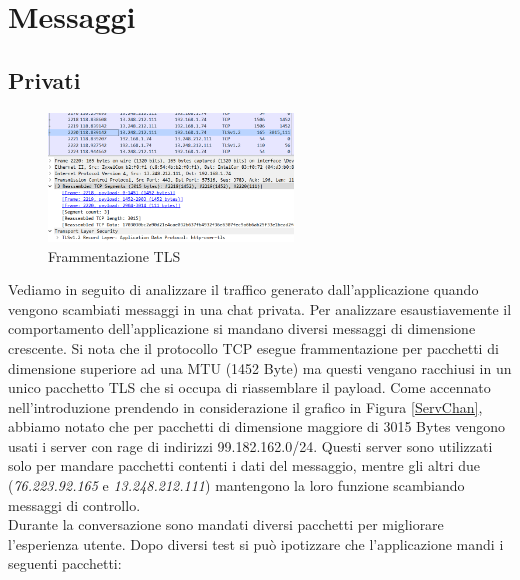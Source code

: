 \documentclass{article}
\begin{document}
\pagebreak

\section{Messaggi}

\subsection{Privati}

\begin{figure}
  \begin{center}
      \vspace{-20pt}
    \includegraphics[width=0.58\textwidth]{framm.png}
  \end{center}
  \vspace{-20pt}
  \caption{Frammentazione TLS}
  \vspace{-10pt}
\end{figure}

Vediamo in seguito di analizzare il traffico generato dall'applicazione 
quando vengono scambiati messaggi in una chat privata. 
Per analizzare esaustiavemente il comportamento dell'applicazione si mandano diversi 
messaggi di dimensione crescente. Si nota che il protocollo TCP esegue frammentazione 
per pacchetti di dimensione superiore ad una MTU (1452 Byte) ma questi
vengano racchiusi in un unico pacchetto TLS che si occupa di riassemblare
il payload. Come accennato nell'introduzione prendendo in considerazione il grafico in Figura \ref{ServChan},
abbiamo notato che per pacchetti di dimensione maggiore di 3015 Bytes vengono usati i server con rage di indirizzi 99.182.162.0/24.
Questi server sono utilizzati solo per mandare pacchetti contenti i dati del messaggio, mentre gli altri due (\textit{76.223.92.165 } e \textit{13.248.212.111})
mantengono la loro funzione scambiando messaggi di controllo.\\ 

Durante la conversazione sono mandati diversi pacchetti per migliorare 
l'esperienza utente. Dopo diversi test si può ipotizzare che l'applicazione mandi i seguenti pacchetti:
\end{document}
